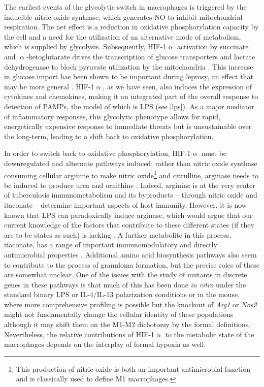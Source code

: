 The earliest events of the glycolytic switch in macrophages is triggered by the inducible nitric oxide synthase, which generates NO to inhibit mitochondrial respiration. The net effect is a reduction in oxidative phosphorylation capacity by the cell and a need for the utilization of an alternative mode of metabolism, which is supplied by glycolysis. Subsequently, HIF-1$\upalpha$ activation by succinate and $\upalpha$-ketoglutarate drives the transcription of glucose transporters and lactate dehydrogenase to block pyruvate utilization by the mitochondria \citep{Russell2019, GalvanPena2014}. This increase in glucose import has been shown to be important during leprosy, an effect that may be more general \citep{Medeiros2016, MontoyaRosales2016, Vance2019}. HIF-1$\upalpha$, as we have seen, also induces the expression of cytokines and chemokines, making it an integrated part of the overall response to detection of PAMPs, the model of which is LPS (see \autoref{lps}). As a major mediator of inflammatory responses, this glycolytic phenotype allows for rapid, energetically expensive response to immediate threats but is unsustainable over the long-term, leading to a shift back to oxidative phosphorylation.

In order to switch back to oxidative phosphorylation, HIF-1$\upalpha$ must be downregulated and alternate pathways induced; rather than nitric oxide synthase consuming cellular arginine to make nitric oxide\footnote{This production of nitric oxide is both an important antimicrobial function and is classically used to define M1 macrophages.} and citrulline, arginase needs to be induced to produce urea and ornithine \citep{Palmieri2020, Qualls2016}. Indeed, arginine is at the very center of tuberculosis immunometabolism and its byproducts -- through nitric oxide and itaconate -- determine important aspects of host immunity. However, it is now known that LPS can paradoxically induce arginase, which would argue that our current knowledge of the factors that contribute to these different states (if they are to be states as such) is lacking \citep{ElKasmi2008}. A further metabolite in this process, itaconate, has a range of important immunomodulatory and directly antimicrobial properties \citep{He2021}. Additional amino acid biosynthesis pathways also seem to contribute to the process of granuloma formation, but the precise roles of these are somewhat unclear. One of the issues with the study of mutants in discrete genes in these pathways is that much of this has been done \textit{in vitro} under the standard binary LPS or IL-4/IL-13 polarization conditions or in the mouse, where more comprehensive profiling is possible but the knockout of \textit{Arg1} or \textit{Nos2} might not fundamentally change the cellular identity of these populations although it may shift them on the M1-M2 dichotomy by the formal definitions. Nevertheless, the relative contributions of HIF-1$\upalpha$ to the metabolic state of the macrophages depends on the interplay of formal hypoxia as well. 

